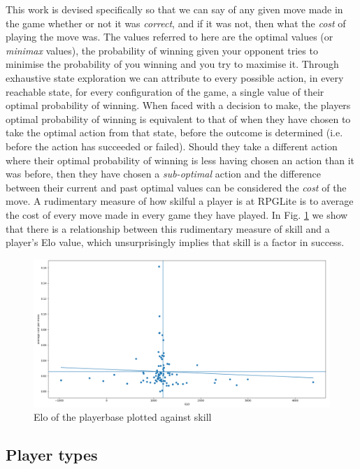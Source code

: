 \documentclass{tufte-handout}
\begin{document}
This work is devised specifically so that we can say of any given move made in the game whether or not it was \textit{correct}, and if it was not, then what the \textit{cost} of playing the move was. The values referred to here are the optimal values (or \textit{minimax} values), the probability of winning given your opponent tries to minimise the probability of you winning and you try to maximise it. Through exhaustive state exploration we can attribute to every possible action, in every reachable state, for every configuration of the game, a single value of their optimal probability of winning. When faced with a decision to make, the players optimal probability of winning is equivalent to that of when they have chosen to take the optimal action from that state, before the outcome is determined (i.e. before the action has succeeded or failed). Should they take a different action where their optimal probability of winning is less having chosen an action than it was before, then they have chosen a \textit{sub-optimal} action and the difference between their current and past optimal values can be considered the \textit{cost} of the move. A rudimentary measure of how skilful a player is at RPGLite is to average the cost of every move made in every game they have played. In Fig. \ref{fig:cost-over-Elo} we show that there is a relationship between this rudimentary measure of skill and a player's Elo value, which unsurprisingly implies that skill is a factor in success.

\begin{figure}
    \centering
    \includegraphics{cost_over_Elo.png}
    \caption{Elo of the playerbase plotted against skill}
    \label{fig:cost-over-Elo}
\end{figure}

\subsection{Player types}
\end{document}
